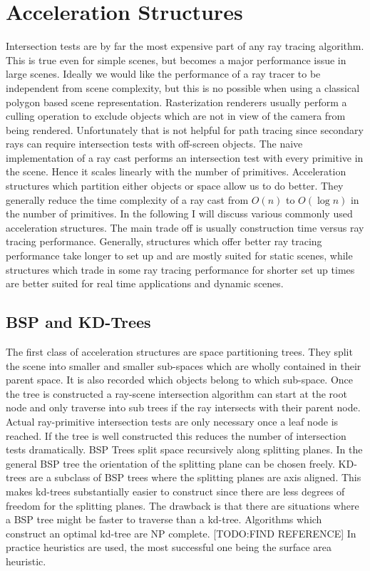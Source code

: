 \documentclass{ACGSeminar}
\begin{document}
\section{Acceleration Structures} \label{acceleration}
Intersection tests are by far the most expensive part of any ray tracing algorithm. \cite[7]{Whitted:1980} This is true even for simple scenes, but becomes a major performance issue in large scenes. Ideally we would like the performance of a ray tracer to be independent from scene complexity, but this is no possible when using a classical polygon based scene representation.
Rasterization renderers usually perform a culling operation to exclude objects which are not in view of the camera from being rendered. Unfortunately that is not helpful for path tracing since secondary rays can require intersection tests with off-screen objects.
The naive implementation of a ray cast performs an intersection test with every primitive in the scene. Hence it scales linearly with the number of primitives. Acceleration structures which partition either objects or space allow us to do better. They generally reduce the time complexity of a ray cast from $O(n)$ to $O(\log n)$ in the number of primitives. In the following I will discuss various commonly used acceleration structures. The main trade off is usually construction time versus ray tracing performance. Generally, structures which offer better ray tracing performance take longer to set up and are mostly suited for static scenes, while structures which trade in some ray tracing performance for shorter set up times are better suited for real time applications and dynamic scenes. \cite{Karras:2012:MPC:2383795.2383801}

\subsection{BSP and KD-Trees}
The first class of acceleration structures are space partitioning trees. They split the scene into smaller and smaller sub-spaces which are wholly contained in their parent space. It is also recorded which objects belong to which sub-space. Once the tree is constructed a ray-scene intersection algorithm can start at the root node and only traverse into sub trees if the ray intersects with their parent node. Actual ray-primitive intersection tests are only necessary once a leaf node is reached. If the tree is well constructed this reduces the number of intersection tests dramatically.
BSP Trees split space recursively along splitting planes. In the general BSP tree the orientation of the splitting plane can be chosen freely. KD-trees are a subclass of BSP trees where the splitting planes are axis aligned. This makes kd-trees substantially easier to construct since there are less degrees of freedom for the splitting planes. The drawback is that there are situations where a BSP tree might be faster to traverse than a kd-tree.
Algorithms which construct an optimal kd-tree are NP complete. [TODO:FIND REFERENCE] In practice heuristics are used, the most successful one being the surface area heuristic. \cite{MacDonald1990}
\end{document}
